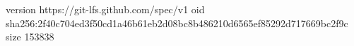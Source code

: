 version https://git-lfs.github.com/spec/v1
oid sha256:2f40c704ed3f50cd1a46b61eb2d08bc8b486210d6565ef85292d717669bc2f9c
size 153838
